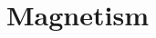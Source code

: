\documentclass[\main/dresen_thesis.tex]{subfiles}
\begin{document}
\section{Magnetism}\label{ch:theoreticalBackground:magnetism}
\end{document}
